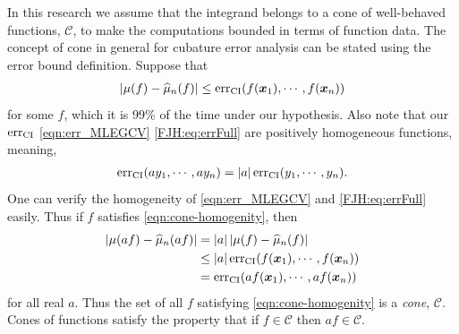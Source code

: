 \documentclass{iitthesis}          %
\newcommand{\bm}[1]{\boldsymbol{#1}}
\newcommand{\vx}{\bm{x}}
\newcommand{\hmu}{\widehat{\mu}}
\newcommand{\err}{\textup{err}}
\def\abs#1{\ensuremath{\left \lvert #1 \right \rvert}}
\begin{document}
In this research we assume that the integrand belongs to a cone of well-behaved functions, $\mathscr{C}$, to make the computations bounded in terms of function data. The concept of cone in general for cubature error analysis can be stated using the error bound definition. 
Suppose that 
\begin{align}
\label{eqn:cone-homogenity}
\abs{\mu(f) - \hmu_n(f)} \le \err_{\textup{CI}} (f(\vx_1), \cdots, f(\vx_n))
\end{align}
for some $f$, which it is 99\% of the time under our hypothesis. Also note that our $\err_{\textup{CI}}$ \eqref{eqn:err_MLEGCV} \eqref{FJH:eq:errFull} are positively homogeneous functions, meaning, 
\begin{align*}
\err_{\textup{CI}} (a y_1, \cdots, a y_n) = \abs{a} \err_{\textup{CI}} ( y_1, \cdots,  y_n).
\end{align*}
One can verify the homogeneity of \eqref{eqn:err_MLEGCV} and \eqref{FJH:eq:errFull} easily.
Thus if $f$ satisfies \eqref{eqn:cone-homogenity}, then
\begin{align*}
\abs{\mu(af) - \hmu_n(af)} &= \abs{a} \abs{\mu(f) - \hmu_n(f)} \\
& \le \abs{a} \err_{\textup{CI}} (f(\vx_1), \cdots, f(\vx_n) ) \\
& = \err_{\textup{CI}} (a f(\vx_1), \cdots, a f(\vx_n))
\end{align*}
for all real $a$. Thus the set of all $f$ satisfying \eqref{eqn:cone-homogenity} is a \emph{cone}, $\mathscr{C}$. Cones of functions satisfy the property that if $f \in \mathscr{C}$ then $af \in \mathscr{C}$.

\end{document}
